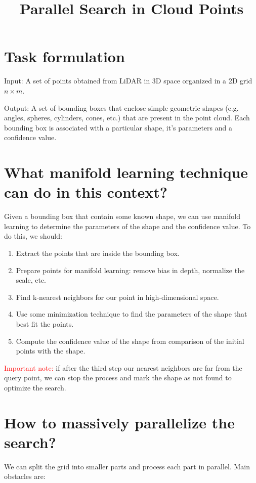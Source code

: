 \documentclass{article}
\begin{document}
\title{Parallel Search in Cloud Points}

\section{Task formulation}

Input: A set of points obtained from LiDAR in 3D space organized in a 2D grid $n \times m$.

Output: A set of bounding boxes that enclose simple geometric shapes (e.g. angles, spheres, cylinders, cones, etc.) that are present in the point cloud.
Each bounding box is associated with a particular shape, it's parameters and a confidence value.

\section{What manifold learning technique can do in this context?}

Given a bounding box that contain some known shape, we can use manifold learning to determine the parameters of the shape and the confidence value.
To do this, we should:

\begin{enumerate}
\item Extract the points that are inside the bounding box.
\item Prepare points for manifold learning: remove bias in depth, normalize the scale, etc.
\item Find k-nearest neighbors for our point in high-dimensional space.
\item Use some minimization technique to find the parameters of the shape that best fit the points.
\item Compute the confidence value of the shape from comparison of the initial points with the shape.
\end{enumerate}

\textcolor{red}{Important note:} if after the third step our nearest neighbors are far from the query point, we can stop the process and mark the shape as not found to optimize the search.

\section{How to massively parallelize the search?}

We can split the grid into smaller parts and process each part in parallel.
Main obstacles are:
\end{document}

